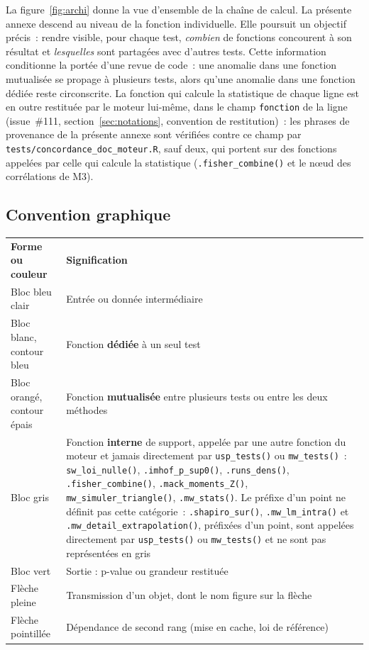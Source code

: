 \documentclass[a4paper,11pt]{article}
\newcommand{\code}[1]{\texttt{\small #1}}
\begin{document}
La figure~\ref{fig:archi} donne la vue d'ensemble de la chaîne de calcul. La
présente annexe descend au niveau de la fonction individuelle. Elle poursuit un
objectif précis~: rendre visible, pour chaque test, \emph{combien} de fonctions
concourent à son résultat et \emph{lesquelles} sont partagées avec d'autres
tests. Cette information conditionne la portée d'une revue de code~: une
anomalie dans une fonction mutualisée se propage à plusieurs tests, alors qu'une
anomalie dans une fonction dédiée reste circonscrite. La fonction qui calcule la statistique de
chaque ligne est en outre restituée par le moteur lui-même, dans le champ \code{fonction} de la
ligne (issue~\#111, section~\ref{sec:notations}, convention de restitution)~: les phrases de provenance de la présente annexe
sont vérifiées contre ce champ par \code{tests/concordance\_doc\_moteur.R}, sauf deux, qui
portent sur des fonctions appelées par celle qui calcule la statistique (\code{.fisher\_combine()}
et le n\oe ud des corrélations de M3).

\subsection{Convention graphique}

\begin{center}
\small
{}
\begin{tabular}{@{}p{4.4cm}p{10.6cm}@{}}
\rowcolor{tableheader}
\textcolor{financeblue}{\textbf{Forme ou couleur}} &
\textcolor{financeblue}{\textbf{Signification}} \\
Bloc bleu clair & Entrée ou donnée intermédiaire \\
Bloc blanc, contour bleu & Fonction \textbf{dédiée} à un seul test \\
Bloc orangé, contour épais & Fonction \textbf{mutualisée} entre plusieurs tests
ou entre les deux méthodes \\
Bloc gris & Fonction \textbf{interne} de support, appelée par une autre
fonction du moteur et jamais directement par \code{usp\_tests()} ou
\code{mw\_tests()}~:\newline
\code{sw\_loi\_nulle()}, \code{.imhof\_p\_sup0()}, \code{.runs\_dens()},\newline
\code{.fisher\_combine()}, \code{.mack\_moments\_Z()},\newline
\code{mw\_simuler\_triangle()}, \code{.mw\_stats()}.\newline
Le préfixe d'un point ne définit pas cette catégorie~: \code{.shapiro\_sur()},
\code{.mw\_lm\_intra()} et \code{.mw\_detail\_extrapolation()}, préfixées d'un
point, sont appelées directement par \code{usp\_tests()} ou \code{mw\_tests()}
et ne sont pas représentées en gris \\
Bloc vert & Sortie : p-value ou grandeur restituée \\
Flèche pleine & Transmission d'un objet, dont le nom figure sur la flèche \\
Flèche pointillée & Dépendance de second rang (mise en cache, loi de référence) \\
\end{tabular}
\end{center}
\end{document}
